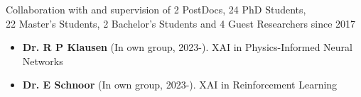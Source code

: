 
\newcommand{\supervision}[3]{\textbf{#1} (In own group, #2). {\small #3}}
\newcommand{\cosupervision}[4]{\textbf{#1} (#2, #3, co-supervision). {\small #4}}

\ifdefined\shortcv
    {
        \hspace*{\fill} Collaboration with and supervision of 2 PostDocs, 24 PhD Students,\\
        \hspace*{\fill} 22 Master's Students, 2 Bachelor's Students and 4 Guest Researchers since 2017
        }
\else
        {
            \begin{itemize}
                \item [] \supervision{Dr. R P Klausen}{2023-}{XAI in Physics-Informed Neural Networks}
                \item [] \supervision{Dr. E Schnoor}{2023-}{XAI in Reinforcement Learning}
            \end{itemize}
        }

